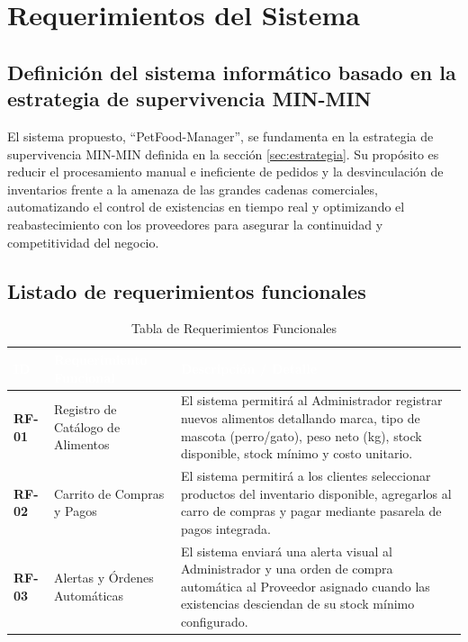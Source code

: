 \section{Requerimientos del Sistema}

\subsection{Definición del sistema informático basado en la estrategia de supervivencia MIN-MIN}
El sistema propuesto, ``PetFood-Manager'', se fundamenta en la estrategia de supervivencia MIN-MIN definida en la sección \ref{sec:estrategia}. Su propósito es reducir el procesamiento manual e ineficiente de pedidos y la desvinculación de inventarios frente a la amenaza de las grandes cadenas comerciales, automatizando el control de existencias en tiempo real y optimizando el reabastecimiento con los proveedores para asegurar la continuidad y competitividad del negocio.

\subsection{Listado de requerimientos funcionales}
\begin{table}[H]
    \centering
    \small
    \renewcommand{\arraystretch}{1.4}
    \begin{tabularx}{\textwidth}{|l|p{4.5cm}|L|}
        \hline
         \textcolor{white}{\textbf{ID}} & \textcolor{white}{\textbf{Requerimiento Funcional}} & \textcolor{white}{\textbf{Descripción / Detalle}} \\
        \hline
        \textbf{RF-01} & Registro de Catálogo de Alimentos & El sistema permitirá al Administrador registrar nuevos alimentos detallando marca, tipo de mascota (perro/gato), peso neto (kg), stock disponible, stock mínimo y costo unitario. \\
        \hline
        \textbf{RF-02} & Carrito de Compras y Pagos & El sistema permitirá a los clientes seleccionar productos del inventario disponible, agregarlos al carro de compras y pagar mediante pasarela de pagos integrada. \\
        \hline
        \textbf{RF-03} & Alertas y Órdenes Automáticas & El sistema enviará una alerta visual al Administrador y una orden de compra automática al Proveedor asignado cuando las existencias desciendan de su stock mínimo configurado. \\
        \hline
    \end{tabularx}
    \caption{Tabla de Requerimientos Funcionales}
    \label{tab:requerimientos_funcionales}
\end{table}

